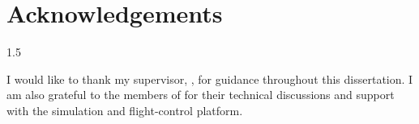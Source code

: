 \chapter*{\centering Acknowledgements}

\begin{spacing}{1.5}
\setlength{\parskip}{0.3in}

I would like to thank my supervisor, \supervisorname, for guidance throughout this dissertation. I am also grateful to the members of \labname{} for their technical discussions and support with the simulation and flight-control platform.

\end{spacing}
\newpage

